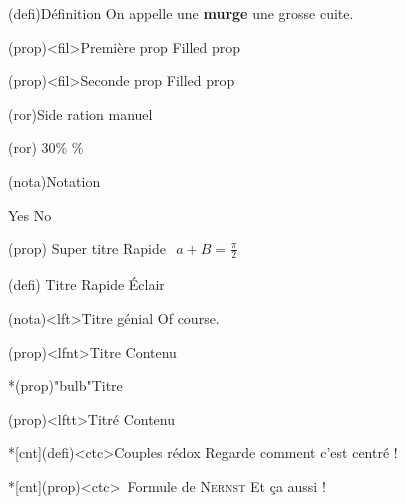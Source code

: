 \documentclass[a4paper, 10pt, garamond]{book}
\begin{document}
\begin{tcb}(defi){Définition}
	On appelle une \textbf{murge} une grosse cuite.
\end{tcb}

\begin{tcb*}(prop)<fil>{Première prop}
	Filled prop
\end{tcb*}

\begin{tcb}(prop)<fil>{Seconde prop}
	Filled prop
\end{tcb}

\begin{tcb}(ror){Side ration manuel}
	\lipsum[1]
	\smallbreak
	\begin{isd}[righthand ratio=.7](ror)
		30\%
		\%
	\end{isd}
\end{tcb}

\begin{tcb*}(nota){Notation}
	\lipsum[1]
	\begin{isd}[cnt]
		Yes
		\tcblower
		No
	\end{isd}
	\lipsum[2]
\end{tcb*}

\sde[right](prop)
{Super titre}{
	Rapide
}{
	$
		\begin{gathered}
			a + B = \frac{\pi}{2}
		\end{gathered}
	$
}


(defi)
{Titre}{
	Rapide
}{
	Éclair
}

\sde[right, ](nota)<lft>{Titre génial}{
	\lipsum[2]
}{
	Of course.
}

\begin{tcb}(prop)<lfnt>{Titre}
	Contenu
\end{tcb}

\begin{tcb}*(prop)"bulb"{Titre}

\end{tcb}

\begin{tcb}(prop)<lftt>{Titré}
	Contenu
\end{tcb}

\begin{tcb}*[cnt](defi)<ctc>{Couples rédox}
  Regarde comment c'est centré !
\end{tcb}
\begin{tcb}*[cnt](prop)<ctc>{\iconsomm~Formule de \textsc{Nernst}}
  Et ça aussi !
\end{tcb}
\end{document}

